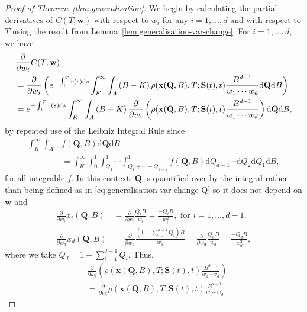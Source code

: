 \documentclass[english]{article}
\numberwithin{equation}{section}
\numberwithin{figure}{section}
\theoremstyle{bolddescit}
\theoremstyle{definition}
\theoremstyle{definition}
\theoremstyle{plain}
\theoremstyle{plain}
\theoremstyle{bolddesc}
\theoremstyle{plain}
\theoremstyle{remark}
\begin{document}
\begin{proof}[Proof of Theorem~\ref{thm:generalisation}]
  We begin by calculating the partial derivatives of $C(T,\mathbf{w})$ with respect to $w_i$ for any $i=1,\ldots,d$ and with respect to $T$ using the result from Lemma~\ref{lem:generalisation-var-change}. For $i=1,\ldots,d$, we have
  \begin{align}
    &\frac{\partial}{\partial w_i} C(T,\mathbf{w})\notag\\
    &= \frac{\partial}{\partial w_i} \left(e^{-\int_t^T r(s) \mathrm{d}s} \int_K^\infty \int_A \left(B - K\right) \rho(\mathbf{x}(\mathbf{Q},B),T;\mathbf{S}(t),t) \frac{B^{d-1}}{w_1 \cdots w_d} \mathrm{d}\mathbf{Q} \mathrm{d}B\right)\notag\\
    &= e^{-\int_t^T r(s) \mathrm{d}s}\int_K^\infty \int_A \left(B - K\right) \frac{\partial}{\partial w_i} \left(\rho(\mathbf{x}(\mathbf{Q},B),T;\mathbf{S}(t),t) \frac{B^{d-1}}{w_1 \cdots w_d}\right) \mathrm{d}\mathbf{Q} \mathrm{d}B,\label{eq:generalisation-deriv-wi}
  \end{align}
  by repeated use of the Leibniz Integral Rule since
  \begin{align*}
    \int_K^\infty \int_A & f(\mathbf{Q},B) \mathrm{d}\mathbf{Q} \mathrm{d}B \\
    &= \int_K^\infty \int_0^1 \int_{Q_1}^1 \cdots \int_{Q_1 + \cdots + Q_{d-2}}^1 f(\mathbf{Q},B) \mathrm{d}Q_{d-1} \cdots \mathrm{d}Q_2 \mathrm{d}Q_1 \mathrm{d}B,
  \end{align*}
  for all integrable $f$. In this context, $\mathbf{Q}$ is quantified over by the integral rather than being defined as in \eqref{eq:generalisation-var-change-Q} so it does not depend on $\mathbf{w}$ and
  \begin{align*}
    \frac{\partial}{\partial w_i} x_i(\mathbf{Q},B)
    &= \frac{\partial}{\partial w_i} \frac{Q_i B}{w_i}
    = \frac{- Q_i B}{w_i^2}, \text{ for } i=1,\ldots,d-1,\\
    \frac{\partial}{\partial w_d} x_d(\mathbf{Q},B)
    &= \frac{\partial}{\partial w_d} \frac{(1 - \sum_{i=1}^{d-1} Q_i) B}{w_d}
    = \frac{\partial}{\partial w_d} \frac{Q_d B}{w_d}
    = \frac{- Q_d B}{w_d^2},
  \end{align*}
  where we take $Q_d = 1 - \sum_{i=1}^{d-1} Q_i$. Thus,
  \begin{align*}
    &\frac{\partial}{\partial w_i} \left(\rho(\mathbf{x}(\mathbf{Q},B),T;\mathbf{S}(t),t) \frac{B^{d-1}}{w_1 \cdots w_d}\right)\\
    &= \frac{\partial}{\partial w_i} \rho(\mathbf{x}(\mathbf{Q},B),T;\mathbf{S}(t),t) \frac{B^{d-1}}{w_1 \cdots w_d}

\end{align*}
\end{proof}
\end{document}

